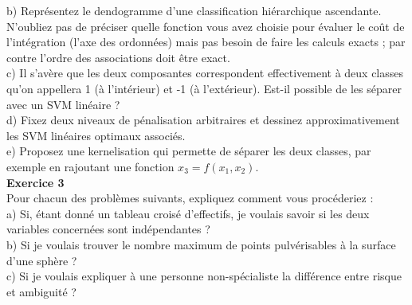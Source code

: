\documentclass[a4paper]{article}
\begin{document}
b) Représentez le dendogramme d'une classification hiérarchique ascendante. N'oubliez pas de préciser quelle fonction vous avez choisie pour évaluer le coût de l'intégration (l'axe des ordonnées) mais pas besoin de faire les calculs exacts ; par contre l'ordre des associations doit être exact.\\

c) Il s'avère que les deux composantes correspondent effectivement à deux classes qu'on appellera 1 (à l'intérieur) et -1 (à l'extérieur). Est-il possible de les séparer avec un SVM linéaire ?\\

d) Fixez deux niveaux de pénalisation arbitraires et dessinez approximativement les SVM linéaires optimaux associés.\\

e) Proposez une kernelisation qui permette de séparer les deux classes, par exemple en rajoutant une fonction $x_3 = f(x_1,x_2)$.\\


\textbf{Exercice 3}\\

Pour chacun des problèmes suivants, expliquez comment vous procéderiez :\\

a) Si, étant donné un tableau croisé d'effectifs, je voulais savoir si les deux variables concernées sont indépendantes ?\\

b) Si je voulais trouver le nombre maximum de points pulvérisables à la surface d'une sphère ?\\

c) Si je voulais expliquer à une personne non-spécialiste la différence entre risque et ambiguité ?\\
\end{document}

